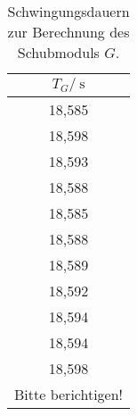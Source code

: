 \begin{table}[ht]
	\centering
	\begin{tabular}{c}
	\toprule
	{$T_G/\:\si{\second}$}\\
	\midrule
18,585\\
18,598\\
18,593\\
18,588\\
18,585\\
18,588\\
18,589\\
18,592\\
18,594\\
18,594\\
18,598\\
{Bitte berichtigen!}\\
	\bottomrule
	\end{tabular}
	\caption{Schwingungsdauern zur Berechnung des Schubmoduls $G$.}
	\label{tab:T_G}
\end{table}